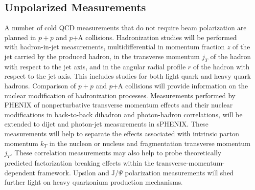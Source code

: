 \subsection {Unpolarized Measurements}

A number of cold QCD measurements that do not require beam polarization are planned in $p+p$ and $p$+A collisions. Hadronization studies will be performed with hadron-in-jet measurements, multidifferential in momentum fraction $z$ of the jet carried by the produced hadron, in the transverse momentum $j_T$ of the hadron with respect to the jet axis, and in the angular radial profile $r$ of the hadron with respect to the jet axis. This includes studies for both light quark and heavy quark hadrons. Comparison of $p+p$ and $p$+A collisions will provide information on the nuclear modification of hadronization processes. Measurements performed by PHENIX of nonperturbative transverse momentum effects and their nuclear modifications in back-to-back dihadron and photon-hadron correlations, will be extended to dijet and photon-jet measurements in sPHENIX.  These measurements will help to separate the effects associated with intrinsic parton momentum $k_T$ in the nucleon or nucleus and fragmentation transverse momentum $j_T$. These correlation measurements may also help to probe theoretically predicted factorization breaking effects within the transverse-momentum-dependent framework. Upsilon and J/$\Psi$ polarization measurements will shed further light on heavy quarkonium production mechanisms.
